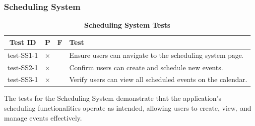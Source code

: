 \documentclass[12pt, titlepage]{article}
\begin{document}

					
					
					



\subsubsection{Scheduling System}

\begin{table}[H]
\centering
\begin{tabular}{|c|c|c|p{6cm}|}
\hline
Test ID & P & F & Test\\
\hline 
test-SS1-1 & $\times$ & & Ensure users can navigate to the scheduling system page.\\
\hline 
test-SS2-1 & $\times$ & & Confirm users can create and schedule new events.\\
\hline 
test-SS3-1 & $\times$ & & Verify users can view all scheduled events on the calendar.\\
\hline
\end{tabular}
\caption{\bf Scheduling System Tests}
\end{table}

The tests for the Scheduling System demonstrate that the application's scheduling functionalities operate as intended, allowing users to create, view, and manage events effectively.




					
					
					

\end{document}
